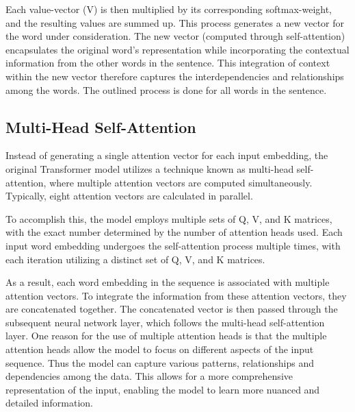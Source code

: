 \documentclass[12pt,oneside,bibtotoc,liststotoc]{scrbook}
\begin{document}
Each value-vector (V) is then multiplied by its corresponding softmax-weight, and the resulting values are summed up. This process generates a new vector for the word under consideration. The new vector (computed through self-attention) encapsulates the original word's representation while incorporating the contextual information from the other words in the sentence. This integration of context within the new vector therefore captures the interdependencies and relationships among the words. The outlined process is done for all words in the sentence. \cite{VaswaniAttentionIsAll}

\subsection{Multi-Head Self-Attention}
Instead of generating a single attention vector for each input embedding, the original Transformer model utilizes a technique known as multi-head self-attention, where multiple attention vectors are computed simultaneously. Typically, eight attention vectors are calculated in parallel.

To accomplish this, the model employs multiple sets of Q, V, and K matrices, with the exact number determined by the number of attention heads used. Each input word embedding undergoes the self-attention process multiple times, with each iteration utilizing a distinct set of Q, V, and K matrices.

As a result, each word embedding in the sequence is associated with multiple attention vectors. To integrate the information from these attention vectors, they are concatenated together. The concatenated vector is then passed through the subsequent neural network layer, which follows the multi-head self-attention layer.
One reason for the use of multiple attention heads is that the multiple attention heads allow the model to focus on different aspects of the input sequence. Thus the model can capture various patterns, relationships and dependencies among the data. This allows for a more comprehensive representation of the input, enabling the model to learn more nuanced and detailed information. \cite{VaswaniAttentionIsAll}
\end{document}
